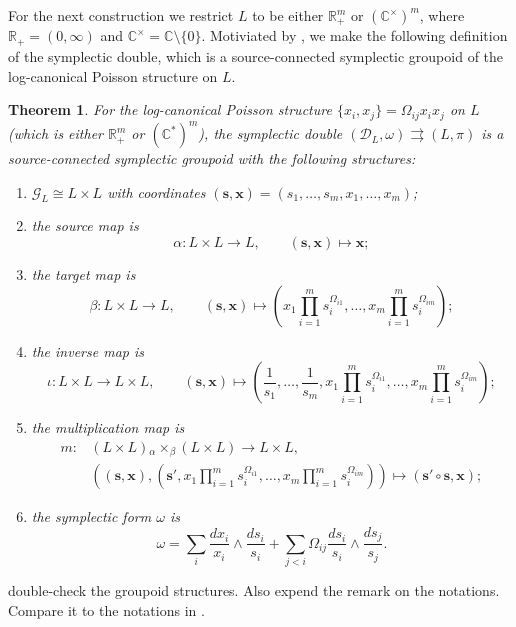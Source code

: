 \documentclass{amsart}
\newtheorem{theorem}{Theorem}[section]
\numberwithin{equation}{section}
\newcommand{\bfs}{\mathbf{s}}
\newcommand{\bfx}{\mathbf{x}}
\newcommand{\cG}{\mathcal{G}}
\newcommand{\cD}{\mathcal{D}}
\newcommand{\CC}{\mathbb{C}}
\newcommand{\RR}{\mathbb{R}}
\newcommand{\rra}{\rightrightarrows}
\begin{document}
For the next construction we restrict $L$ to be either $\RR_+^m$ or $(\CC^\times)^m$, where $\RR_+ = (0, \infty)$ and $\CC^\times = \CC \setminus \{0\}$.
Motiviated by \cite{MR2470108}, we make the following definition of the symplectic double, which is a source-connected symplectic groupoid of the log-canonical Poisson structure on $L$.
\begin{theorem} 
  \cite{MR2470108}
  For the log-canonical Poisson structure $\{x_i, x_j\} = \Omega_{ij} x_i x_j$ on $L$ (which is either $\RR_+^m$ or $(\CC^*)^m$), the \emph{symplectic double} $(\cD_L, \omega) \rra (L, \pi)$ is a source-connected symplectic groupoid with the following structures:
  \begin{enumerate}
    \item $\cG_L \cong L \times L$ with coordinates $(\bfs, \bfx) = (s_1, \ldots, s_m, x_1, \ldots, x_m)$;
    \item the source map is
      \[\alpha: L \times L \to L, \qquad (\bfs, \bfx) \mapsto \bfx;\]
    \item the target map is
      \[\beta: L \times L \to L, \qquad (\bfs, \bfx) \mapsto \left(x_1 \prod_{i=1}^m s_i^{\Omega_{i1}}, \ldots, x_m \prod_{i=1}^m s_i^{\Omega_{im}}\right);\]
    \item the inverse map is
      \[\iota: L \times L \to L \times L, \qquad (\bfs, \bfx) \mapsto \left(\frac{1}{s_1}, \ldots, \frac{1}{s_m}, x_1 \prod_{i=1}^m s_i^{\Omega_{i1}}, \ldots, x_m \prod_{i=1}^m s_i^{\Omega_{im}}\right);\]
    \item the multiplication map is
      \[\begin{aligned}
	  m: & \left(L \times L\right) {_\alpha \times_\beta} \left(L \times L\right) \to L \times L, \\
	     & \left((\bfs, \bfx), \left(\bfs', x_1 \prod_{i=1}^m s_i^{\Omega_{i1}}, \ldots, x_m \prod_{i=1}^m s_i^{\Omega_{im}}\right)\right) \mapsto (\bfs' \circ \bfs, \bfx );
        \end{aligned}\]
    \item the symplectic form $\omega$ is
      \begin{equation} 
        \label{eq:2-formG_X}
	\omega = \sum_{i} \frac{dx_i}{x_i} \wedge \frac{ds_i}{s_i} + \sum_{j < i} \Omega_{ij} \frac{ds_i}{s_i} \wedge \frac{ds_j}{s_j}.
      \end{equation}
  \end{enumerate}
\end{theorem}

{\color{red} double-check the groupoid structures. Also expend the remark on the notations. Compare it to the notations in \cite{MR2470108}.}
\end{document}
